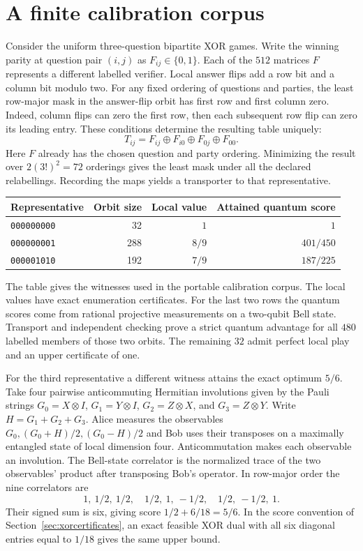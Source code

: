 \section{A finite calibration corpus}

Consider the uniform three-question bipartite XOR games. Write the winning
parity at question pair $(i,j)$ as $F_{ij}\in\{0,1\}$. Each of the $512$
matrices $F$ represents a different labelled verifier. Local answer flips add
a row bit and a column bit modulo two. For any fixed ordering of questions
and parties, the least row-major mask in the answer-flip orbit has first row
and first column zero. Indeed, column flips can zero the first row, then each
subsequent row flip can zero its leading entry. These conditions determine the
resulting table uniquely:
\[
 T_{ij}=F_{ij}\mathbin{\oplus} F_{i0}\mathbin{\oplus} F_{0j}
                  \mathbin{\oplus} F_{00}.
\]
Here $F$ already has the chosen question and party ordering. Minimizing the
result over $2(3!)^2=72$ orderings gives the least mask under all the declared
relabellings. Recording the maps yields a transporter to that representative.

\begin{center}
\begin{tabular}{lrrr}
\toprule
Representative & Orbit size & Local value & Attained quantum score\\
\midrule
\texttt{000000000} & 32  & $1$   & $1$\\
\texttt{000000001} & 288 & $8/9$ & $401/450$\\
\texttt{000001010} & 192 & $7/9$ & $187/225$\\
\bottomrule
\end{tabular}
\end{center}
The table gives the witnesses used in the portable calibration corpus. The
local values have exact enumeration certificates. For the last two rows the
quantum scores come from rational projective measurements on a two-qubit Bell
state. Transport and independent checking prove a strict quantum advantage
for all $480$ labelled members of those two orbits. The remaining $32$ admit
perfect local play and an upper certificate of one.

For the third representative a different witness attains the exact optimum
$5/6$. Take four pairwise anticommuting Hermitian involutions given by the Pauli
strings $G_0=X\otimes I$, $G_1=Y\otimes I$, $G_2=Z\otimes X$, and
$G_3=Z\otimes Y$. Write $H=G_1+G_2+G_3$. Alice measures the observables
$G_0,(G_0+H)/2,(G_0-H)/2$ and Bob uses their transposes on a maximally
entangled state of local dimension four. Anticommutation makes each observable
an involution. The Bell-state correlator is the normalized trace of the
two observables' product after transposing Bob's operator. In row-major
order the nine correlators are
\[
 1,\ 1/2,\ 1/2,\quad 1/2,\ 1,\ -1/2,\quad 1/2,\ -1/2,\ 1.
\]
Their signed sum is six, giving score $1/2+6/18=5/6$. In the score convention
of Section~\ref{sec:xorcertificates}, an exact feasible XOR dual with all six
diagonal entries equal to $1/18$ gives the same upper bound.
